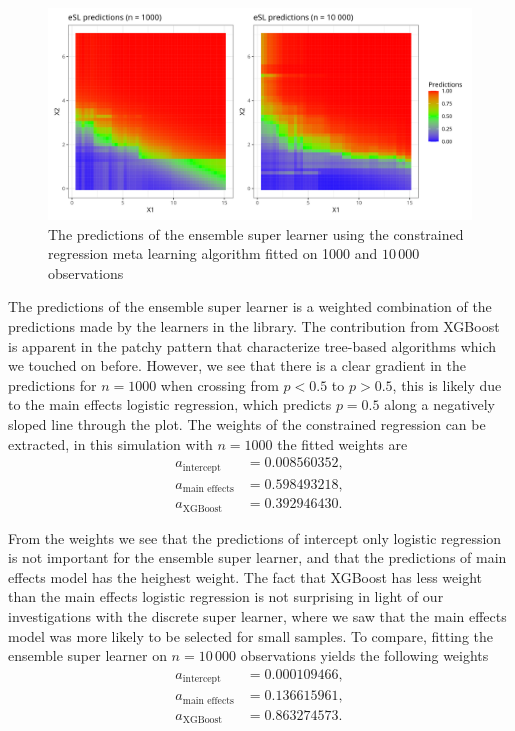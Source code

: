 \documentclass[./main.tex]{subfiles}
\begin{document}
\begin{figure}[H]
    \centering
    \includegraphics[width=\textwidth]{figures/esl_preds_par.png}
    \caption{The predictions of the ensemble super learner using the constrained regression meta learning algorithm fitted on 1000 and $ 10\,000 $ observations}
    \label{fig:esl_preds_quad_prog}
\end{figure}
The predictions of the ensemble super learner is a weighted combination of the predictions made by the learners in the library. The contribution from XGBoost is apparent in the patchy pattern that characterize tree-based algorithms which we touched on before. However, we see that there is a clear gradient in the predictions for $ n = 1000 $ when crossing from $ p < 0.5 $ to $ p > 0.5 $, this is likely due to the main effects logistic regression, which predicts $ p = 0.5 $ along a negatively sloped line through the plot. The weights of the constrained regression can be extracted, in this simulation with $ n = 1000 $ the fitted weights are
\begin{align*}
    a_{\text{intercept}} &=0.008560352, \\
    a_{\text{main effects}} &= 0.598493218, \\
    a_{\text{XGBoost}} &= 0.392946430.
\end{align*}

From the weights we see that the predictions of intercept only logistic regression is not important for the ensemble super learner, and that the predictions of main effects model has the heighest weight. The fact that XGBoost has less weight than the main effects logistic regression is not surprising in light of our investigations with the discrete super learner, where we saw that the main effects model was more likely to be selected for small samples. To compare, fitting the ensemble super learner on $ n = 10\,000 $ observations yields the following weights
\begin{align*}
    a_{\text{intercept}} &= 0.000109466, \\
    a_{\text{main effects}} &= 0.136615961, \\
    a_{\text{XGBoost}} &= 0.863274573.
\end{align*}
\end{document}
